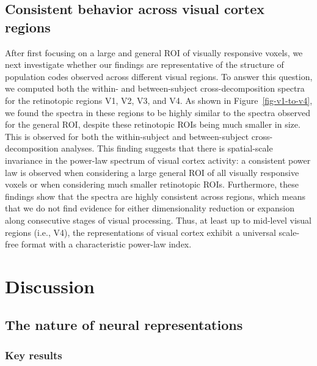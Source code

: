 \documentclass[10pt]{article}
\begin{document}
\subsection{Consistent behavior across visual cortex
regions}\label{consistent-behavior-across-visual-cortex-regions}

After first focusing on a large and general ROI of visually responsive
voxels, we next investigate whether our findings are representative of
the structure of population codes observed across different visual
regions. To answer this question, we computed both the within- and
between-subject cross-decomposition spectra for the retinotopic regions
V1, V2, V3, and V4. As shown in Figure~\ref{fig-v1-to-v4}, we found the
spectra in these regions to be highly similar to the spectra observed
for the general ROI, despite these retinotopic ROIs being much smaller
in size. This is observed for both the within-subject and
between-subject cross-decomposition analyses. This finding suggests that
there is spatial-scale invariance in the power-law spectrum of visual
cortex activity: a consistent power law is observed when considering a
large general ROI of all visually responsive voxels or when considering
much smaller retinotopic ROIs. Furthermore, these findings show that the
spectra are highly consistent across regions, which means that we do not
find evidence for either dimensionality reduction or expansion along
consecutive stages of visual processing. Thus, at least up to mid-level
visual regions (i.e., V4), the representations of visual cortex exhibit
a universal scale-free format with a characteristic power-law index.

\section{Discussion}\label{discussion}

\subsection{The nature of neural
representations}\label{the-nature-of-neural-representations}

\subsubsection{Key results}\label{key-results}
\end{document}
